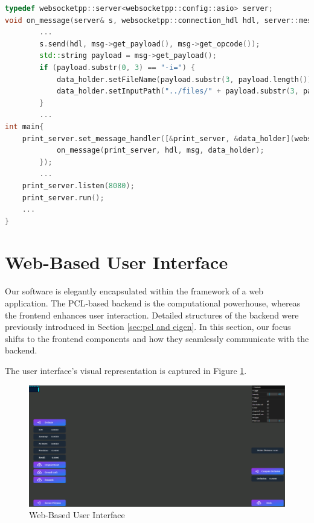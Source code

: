 \documentclass[11pt, a4paper,oneside,chapterprefix=false]{scrbook}
\begin{document}
\begin{lstlisting}[language=C++, caption=Websocket Server]
typedef websocketpp::server<websocketpp::config::asio> server;
void on_message(server& s, websocketpp::connection_hdl hdl, server::message_ptr msg, DataHolder& data_holder) {
        ...
		s.send(hdl, msg->get_payload(), msg->get_opcode());
		std::string payload = msg->get_payload();
		if (payload.substr(0, 3) == "-i=") {
			data_holder.setFileName(payload.substr(3, payload.length()));
			data_holder.setInputPath("../files/" + payload.substr(3, payload.length()));
		}
		...
int main{
	print_server.set_message_handler([&print_server, &data_holder](websocketpp::connection_hdl hdl, server::message_ptr msg) {
            on_message(print_server, hdl, msg, data_holder);
        });
        ...
	print_server.listen(8080);
	print_server.run();
	...	
}
\end{lstlisting}

\section{Web-Based User Interface} \label{sec:three.js}

Our software is elegantly encapsulated within the framework of a web application. The PCL-based backend is the computational powerhouse, whereas the frontend enhances user interaction. Detailed structures of the backend were previously introduced in Section \ref{sec:pcl and eigen}. In this section, our focus shifts to the frontend components and how they seamlessly communicate with the backend.

\vspace{10pt}

The user interface's visual representation is captured in Figure \ref{fig:web user interface}.

\begin{figure}[H]
	\centering
	\includegraphics*[width=1.0\textwidth]{figures/ui.png}
	\caption{Web-Based User Interface}
	\label{fig:web user interface}
\end{figure}
\end{document}
